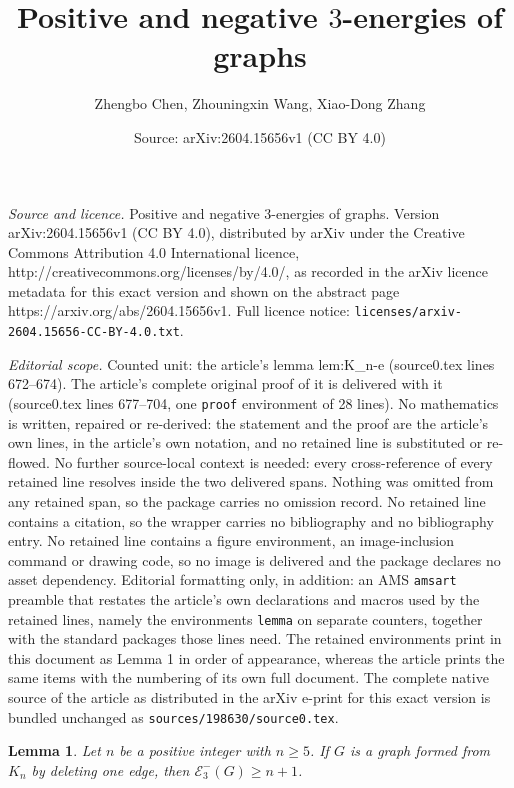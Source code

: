 \documentclass[10pt,a4paper]{amsart}
\title{Positive and negative $3$-energies of graphs}
\author{Zhengbo Chen, Zhouningxin Wang, Xiao-Dong Zhang}
\date{Source: arXiv:2604.15656v1 (CC BY 4.0)}
\newtheorem{lemma}{Lemma}
\begin{document}
\maketitle

\noindent\emph{Source and licence.} Positive and negative $3$-energies of graphs. Version arXiv:2604.15656v1 (CC BY 4.0), distributed by arXiv under the Creative Commons Attribution 4.0 International licence, http://creativecommons.org/licenses/by/4.0/, as recorded in the arXiv licence metadata for this exact version and shown on the abstract page https://arxiv.org/abs/2604.15656v1. Full licence notice: \texttt{licenses/arxiv-2604.15656-CC-BY-4.0.txt}.\par\smallskip

\noindent\textit{Editorial scope.} Counted unit: the article's lemma lem:K\_n-e (source0.tex lines 672--674). The article's complete original proof of it is delivered with it (source0.tex lines 677--704, one \texttt{proof} environment of 28 lines). No mathematics is written, repaired or re-derived: the statement and the proof are the article's own lines, in the article's own notation, and no retained line is substituted or re-flowed.  No further source-local context is needed: every cross-reference of every retained line resolves inside the two delivered spans.  Nothing was omitted from any retained span, so the package carries no omission record.  No retained line contains a citation, so the wrapper carries no bibliography and no bibliography entry.  No retained line contains a figure environment, an image-inclusion command or drawing code, so no image is delivered and the package declares no asset dependency.  Editorial formatting only, in addition: an AMS \texttt{amsart} preamble that restates the article's own declarations and macros used by the retained lines, namely the environments \texttt{lemma} on separate counters, together with the standard packages those lines need.  The retained environments print in this document as Lemma 1 in order of appearance, whereas the article prints the same items with the numbering of its own full document.  The complete native source of the article as distributed in the arXiv e-print for this exact version is bundled unchanged as \texttt{sources/198630/source0.tex}.
\begin{lemma}\label{lem:K_n-e}
Let $n$ be a positive integer with $n\geq 5$. If $G$ is a graph formed from $K_n$ by deleting one edge, then $\mathcal{E}_3^{-}(G)\geq n+1$.
\end{lemma}
\end{document}
